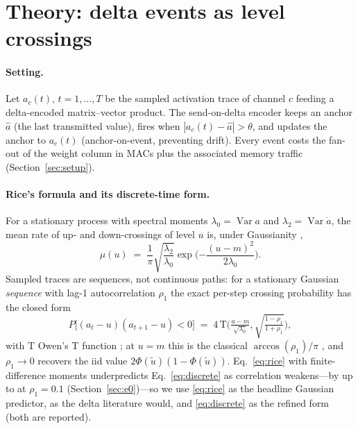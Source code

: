 \documentclass[10pt]{article}
\begin{document}
\section{Theory: delta events as level crossings}
\label{sec:theory}

\paragraph{Setting.}
Let $a_c(t)$, $t=1,\dots,T$ be the sampled activation trace of channel $c$
feeding a delta-encoded matrix--vector product. The send-on-delta encoder
\citep{neil2017delta,miskowicz2006} keeps an anchor $\hat a$ (the last
transmitted value), fires when $|a_c(t)-\hat a|>\theta$, and updates the
anchor to $a_c(t)$ (anchor-on-event, preventing drift). Every event costs
the fan-out of the weight column in MACs plus the associated memory traffic
(Section~\ref{sec:setup}).

\paragraph{Rice's formula and its discrete-time form.}
For a stationary process with spectral moments
$\lambda_0=\operatorname{Var} a$ and $\lambda_2=\operatorname{Var}\dot a$,
the mean rate of up- and down-crossings of level $u$ is, under Gaussianity
\citep{rice1944},
\begin{equation}
\mu(u) \;=\; \frac{1}{\pi}\sqrt{\frac{\lambda_2}{\lambda_0}}
\exp\!\Big({-\frac{(u-m)^2}{2\lambda_0}}\Big).
\label{eq:rice}
\end{equation}
Sampled traces are sequences, not continuous paths: for a stationary
Gaussian \emph{sequence} with lag-1 autocorrelation $\rho_1$ the exact
per-step crossing probability has the closed form
\begin{equation}
P\big[(a_t-u)(a_{t+1}-u)<0\big] \;=\; 4\,
\mathrm{T}\!\Big(\tfrac{u-m}{\sqrt{\lambda_0}},
\sqrt{\tfrac{1-\rho_1}{1+\rho_1}}\Big),
\label{eq:discrete}
\end{equation}
with $\mathrm{T}$ Owen's T function \citep{owen1956}; at $u=m$ this is the
classical $\arccos(\rho_1)/\pi$ \citep{kedem1994book}, and $\rho_1\to 0$
recovers the iid value $2\Phi(\tilde u)(1-\Phi(\tilde u))$.
Eq.~\eqref{eq:rice} with finite-difference moments underpredicts
Eq.~\eqref{eq:discrete} as correlation weakens---by up to \OURiceFDWorst{}
at $\rho_1=0.1$ (Section~\ref{sec:e0})---so we use \eqref{eq:rice} as the
headline Gaussian predictor, as the delta literature would, and
\eqref{eq:discrete} as the refined form (both are reported).
\end{document}
